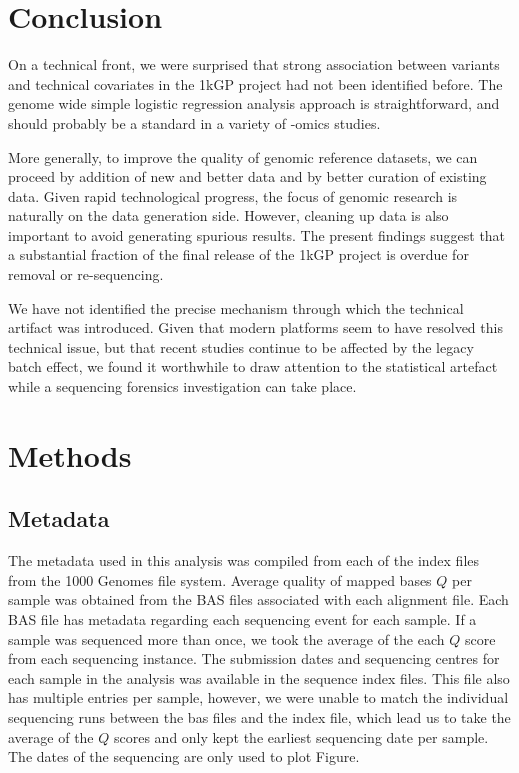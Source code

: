 \documentclass[9pt,lineno]{elife}
\begin{document}
\section{Conclusion}

On a technical front, we were surprised that strong association between variants and technical covariates in the 1kGP project had not been identified before. 
The genome wide simple logistic regression analysis approach is straightforward, and should probably be a standard in a variety of -omics studies. 

More generally, to improve the quality of genomic reference datasets, we can proceed by addition of new and better data and by better curation of existing data.
Given rapid technological progress, the focus of genomic research is naturally on the data generation side. 
However, cleaning up data is also important to avoid generating spurious results. 
The present findings suggest that a substantial fraction of the final release of the 1kGP project is overdue for removal or re-sequencing.

We have not identified the precise mechanism through which the technical artifact was introduced. Given that modern platforms seem to have resolved this technical issue, but that recent studies continue to be affected by the legacy batch effect, we found it worthwhile to draw attention to the statistical artefact while a sequencing forensics investigation can take place. 


\section{Methods}
\subsection{Metadata}
The metadata used in this analysis was compiled from each of the index files from the 1000 Genomes file system. 
Average quality of mapped bases $Q$ per sample was obtained from the BAS files associated with each alignment file. 
Each BAS file has metadata regarding each sequencing event for each sample. 
If a sample was sequenced more than once, we took the average of the each $Q$ score from each sequencing instance. 
The submission dates and sequencing centres for each sample in the analysis was available in the sequence index files.  
This file also has multiple entries per sample, however, we were unable to match the individual sequencing runs between the bas files and the index file, which lead us to take the average of the $Q$ scores and only kept the earliest sequencing date per sample. 
The dates of the sequencing are only used to plot Figure.
\end{document}
